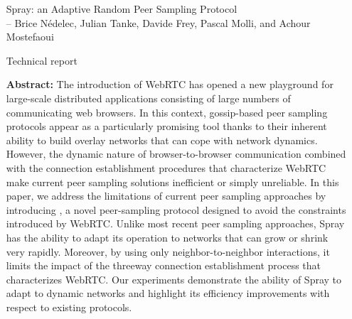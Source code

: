 \begin{itemize}
\item [Spray: an Adaptive Random Peer Sampling Protocol]\ \\
  -- Brice Nédelec, Julian Tanke, Davide Frey, Pascal Molli, and Achour Mostefaoui
\item [Technical report]
\item [\textbf{Abstract:}] {\small The introduction of WebRTC has opened a new
    playground for large-scale distributed applications consisting of large
    numbers of communicating web browsers. In this context, gossip-based peer
    sampling protocols appear as a particularly promising tool thanks to their
    inherent ability to build overlay networks that can cope with network
    dynamics. However, the dynamic nature of browser-to-browser communication
    combined with the connection establishment procedures that characterize
    WebRTC make current peer sampling solutions inefficient or simply
    unreliable. In this paper, we address the limitations of current peer
    sampling approaches by introducing \SPRAY, a novel peer-sampling protocol
    designed to avoid the constraints introduced by WebRTC. Unlike most recent
    peer sampling approaches, Spray has the ability to adapt its operation to
    networks that can grow or shrink very rapidly. Moreover, by using only
    neighbor-to-neighbor interactions, it limits the impact of the threeway
    connection establishment process that characterizes WebRTC. Our experiments
    demonstrate the ability of Spray to adapt to dynamic networks and highlight
    its efficiency improvements with respect to existing protocols.}
\end{itemize}


